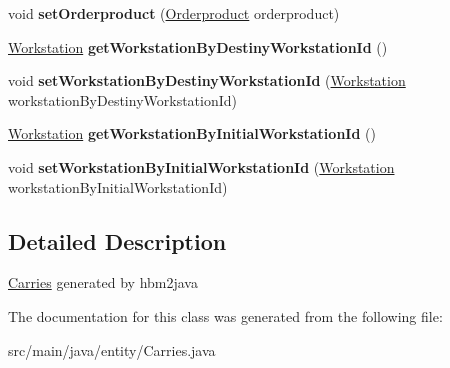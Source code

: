 \begin{DoxyCompactItemize}
\item 
\mbox{\label{classentity_1_1_carries_af3856ed5dc8866063ed552e5a6289736}} 
void {\bfseries set\+Orderproduct} (\mbox{\hyperlink{classentity_1_1_orderproduct}{Orderproduct}} orderproduct)
\item 
\mbox{\label{classentity_1_1_carries_a13e9ee65fee8f33abd1b5fcd4da046c2}} 
\mbox{\hyperlink{classentity_1_1_workstation}{Workstation}} {\bfseries get\+Workstation\+By\+Destiny\+Workstation\+Id} ()
\item 
\mbox{\label{classentity_1_1_carries_a97c1c2cb313a25a61f86e538345ae58f}} 
void {\bfseries set\+Workstation\+By\+Destiny\+Workstation\+Id} (\mbox{\hyperlink{classentity_1_1_workstation}{Workstation}} workstation\+By\+Destiny\+Workstation\+Id)
\item 
\mbox{\label{classentity_1_1_carries_a4d75d589a3902ef133f3be58d725b852}} 
\mbox{\hyperlink{classentity_1_1_workstation}{Workstation}} {\bfseries get\+Workstation\+By\+Initial\+Workstation\+Id} ()
\item 
\mbox{\label{classentity_1_1_carries_a807fe564289f14063a30047d3cea3522}} 
void {\bfseries set\+Workstation\+By\+Initial\+Workstation\+Id} (\mbox{\hyperlink{classentity_1_1_workstation}{Workstation}} workstation\+By\+Initial\+Workstation\+Id)
\end{DoxyCompactItemize}


\subsection{Detailed Description}
\mbox{\hyperlink{classentity_1_1_carries}{Carries}} generated by hbm2java 

The documentation for this class was generated from the following file\+:\begin{DoxyCompactItemize}
\item 
src/main/java/entity/Carries.\+java\end{DoxyCompactItemize}
